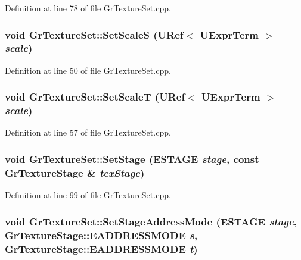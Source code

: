 Definition at line 78 of file GrTextureSet.cpp.\hypertarget{class_gr_texture_set_20a06dab1bf98d79626a26d77de2ff05}{
\subsubsection[{SetScaleS}]{\setlength{\rightskip}{0pt plus 5cm}void GrTextureSet::SetScaleS ({\bf URef}$<$ {\bf UExprTerm} $>$ {\em scale})}}
\label{class_gr_texture_set_20a06dab1bf98d79626a26d77de2ff05}




Definition at line 50 of file GrTextureSet.cpp.\hypertarget{class_gr_texture_set_383a76cd969a2a9d4f71344a73ba1b5a}{
\subsubsection[{SetScaleT}]{\setlength{\rightskip}{0pt plus 5cm}void GrTextureSet::SetScaleT ({\bf URef}$<$ {\bf UExprTerm} $>$ {\em scale})}}
\label{class_gr_texture_set_383a76cd969a2a9d4f71344a73ba1b5a}




Definition at line 57 of file GrTextureSet.cpp.\hypertarget{class_gr_texture_set_08cc84ed0a2ec34df478d22f1176525f}{
\subsubsection[{SetStage}]{\setlength{\rightskip}{0pt plus 5cm}void GrTextureSet::SetStage ({\bf ESTAGE} {\em stage}, \/  const {\bf GrTextureStage} \& {\em texStage})}}
\label{class_gr_texture_set_08cc84ed0a2ec34df478d22f1176525f}




Definition at line 99 of file GrTextureSet.cpp.\hypertarget{class_gr_texture_set_1890ebcb02d234fefa1f732d08c54035}{
\subsubsection[{SetStageAddressMode}]{\setlength{\rightskip}{0pt plus 5cm}void GrTextureSet::SetStageAddressMode ({\bf ESTAGE} {\em stage}, \/  {\bf GrTextureStage::EADDRESSMODE} {\em s}, \/  {\bf GrTextureStage::EADDRESSMODE} {\em t})}}
\label{class_gr_texture_set_1890ebcb02d234fefa1f732d08c54035}




